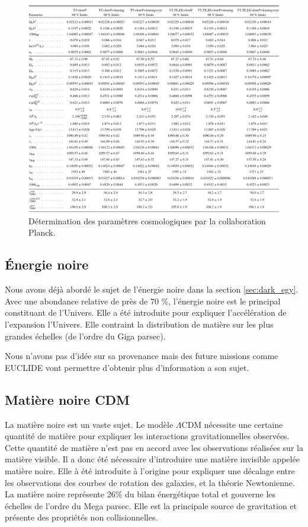 

\begin{figure}[bth]
        \includegraphics[width=.95\linewidth]{img/01/table_planck.pdf} 
        \caption[Tables paramètres cosmologique]{Détermination des paramètres cosmologiques par la collaboration Planck.}
 		\label{fig:planck_parameters}
\end{figure}



\subsection{Énergie noire}
Nous avons déjà abordé le sujet de l'énergie noire dans la section \ref{sec:dark_egy}.
Avec une abondance relative de près de 70 \%, l'énergie noire est le principal constituant de l'Univers.
Elle a été introduite pour expliquer l'accélération de l'expansion l'Univers.
Elle contraint la distribution de matière sur les plus grandes échelles (de l'ordre du Giga parsec).

Nous n'avons pas d'idée sur sa provenance mais des future missions comme EUCLIDE %
vont permettre d'obtenir plus d'information a son sujet.


\subsection{Matière noire CDM}

La matière noire est un vaste sujet.
Le modèle $\Lambda$CDM nécessite une certaine quantité de matière pour expliquer les interactions gravitationnelles observées.
Cette quantité de matière n'est pas en accord avec les observations réalisées sur la matière visible.
Il a donc été nécessaire d’introduire une matière invisible appelée matière noire.
Elle à été introduite à l'origine pour expliquer une décalage entre les observations des courbes de rotation des galaxies, et la théorie Newtonienne.
La matière noire représente 26\% du bilan énergétique total et gouverne les échelles de l'ordre du Mega parsec.
Elle est la principale source de gravitation et présente des propriétés non collisionnelles.

